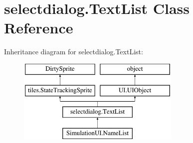 \hypertarget{classselectdialog_1_1TextList}{\section{selectdialog.\-Text\-List Class Reference}
\label{classselectdialog_1_1TextList}
}
Inheritance diagram for selectdialog.\-Text\-List\-:\begin{figure}[H]
\begin{center}
\leavevmode
\includegraphics[height=4.000000cm]{classselectdialog_1_1TextList}
\end{center}
\end{figure}
